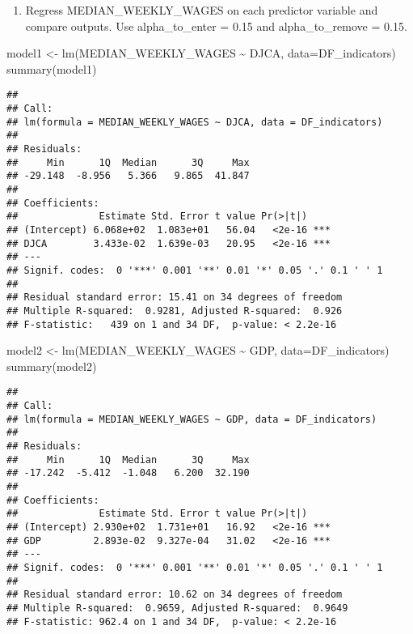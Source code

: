 \documentclass[
]{article}
\newenvironment{Shaded}{\begin{snugshade}}{\end{snugshade}}
\newcommand{\AttributeTok}[1]{\textcolor[rgb]{0.77,0.63,0.00}{#1}}
\newcommand{\FunctionTok}[1]{\textcolor[rgb]{0.00,0.00,0.00}{#1}}
\newcommand{\NormalTok}[1]{#1}
\newcommand{\OtherTok}[1]{\textcolor[rgb]{0.56,0.35,0.01}{#1}}
\newcommand{\SpecialCharTok}[1]{\textcolor[rgb]{0.00,0.00,0.00}{#1}}
\providecommand{\tightlist}{%
  \setlength{\itemsep}{0pt}\setlength{\parskip}{0pt}}
\begin{document}
\begin{enumerate}
\def\labelenumi{\arabic{enumi}.}
\tightlist
\item
  Regress MEDIAN\_WEEKLY\_WAGES on each predictor variable and compare
  outputs. Use alpha\_to\_enter = 0.15 and alpha\_to\_remove = 0.15.
\end{enumerate}

\begin{Shaded}
\begin{Highlighting}[]
\NormalTok{model1 }\OtherTok{\textless{}{-}} \FunctionTok{lm}\NormalTok{(MEDIAN\_WEEKLY\_WAGES }\SpecialCharTok{\textasciitilde{}}\NormalTok{ DJCA, }\AttributeTok{data=}\NormalTok{DF\_indicators)}
\FunctionTok{summary}\NormalTok{(model1)}
\end{Highlighting}
\end{Shaded}

\begin{verbatim}
## 
## Call:
## lm(formula = MEDIAN_WEEKLY_WAGES ~ DJCA, data = DF_indicators)
## 
## Residuals:
##     Min      1Q  Median      3Q     Max 
## -29.148  -8.956   5.366   9.865  41.847 
## 
## Coefficients:
##              Estimate Std. Error t value Pr(>|t|)    
## (Intercept) 6.068e+02  1.083e+01   56.04   <2e-16 ***
## DJCA        3.433e-02  1.639e-03   20.95   <2e-16 ***
## ---
## Signif. codes:  0 '***' 0.001 '**' 0.01 '*' 0.05 '.' 0.1 ' ' 1
## 
## Residual standard error: 15.41 on 34 degrees of freedom
## Multiple R-squared:  0.9281, Adjusted R-squared:  0.926 
## F-statistic:   439 on 1 and 34 DF,  p-value: < 2.2e-16
\end{verbatim}

\begin{Shaded}
\begin{Highlighting}[]
\NormalTok{model2 }\OtherTok{\textless{}{-}} \FunctionTok{lm}\NormalTok{(MEDIAN\_WEEKLY\_WAGES }\SpecialCharTok{\textasciitilde{}}\NormalTok{ GDP, }\AttributeTok{data=}\NormalTok{DF\_indicators)}
\FunctionTok{summary}\NormalTok{(model2)}
\end{Highlighting}
\end{Shaded}

\begin{verbatim}
## 
## Call:
## lm(formula = MEDIAN_WEEKLY_WAGES ~ GDP, data = DF_indicators)
## 
## Residuals:
##     Min      1Q  Median      3Q     Max 
## -17.242  -5.412  -1.048   6.200  32.190 
## 
## Coefficients:
##              Estimate Std. Error t value Pr(>|t|)    
## (Intercept) 2.930e+02  1.731e+01   16.92   <2e-16 ***
## GDP         2.893e-02  9.327e-04   31.02   <2e-16 ***
## ---
## Signif. codes:  0 '***' 0.001 '**' 0.01 '*' 0.05 '.' 0.1 ' ' 1
## 
## Residual standard error: 10.62 on 34 degrees of freedom
## Multiple R-squared:  0.9659, Adjusted R-squared:  0.9649 
## F-statistic: 962.4 on 1 and 34 DF,  p-value: < 2.2e-16
\end{verbatim}
\end{document}
